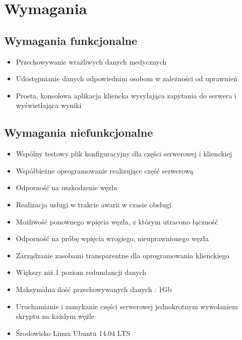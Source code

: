 \chapter{Wymagania}



\section{Wymagania funkcjonalne}

\begin{itemize}
\item Przechowywanie wrażliwych danych medycznych
\item Udostępnianie danych odpowiednim osobom w zależności od uprawnień
\item Prosta, konsolowa aplikacja kliencka wysyłająca zapytania do serwera i wyświetlająca wyniki
\end{itemize}

\section{Wymagania niefunkcjonalne}

\begin{itemize}
\item Wspólny testowy plik konfiguracyjny dla części serwerowej i klienckiej
\item Współbieżne oprogramowanie realizujące część serwerową
\item Odporność na uszkodzenie węzła
\item Realizacja usługi w trakcie awarii w czasie obsługi
\item Możliwość ponownego wpięcia węzła, z którym utracono łączność
\item Odporność na próbę wpięcia wrogiego, nieuprawnionego węzła
\item Zarządzanie zasobami transparentne dla oprogramowania klienckiego
\item Większy niż 1 poziom redundancji danych
\item Maksymalna ilość przechowywanych danych : 1Gb
\item Uruchamianie i zamykanie części serwerowej jednokrotnym wywolaniem skryptu na każdym węźle
\item Środowisko Linux Ubuntu 14.04 LTS
\end{itemize}